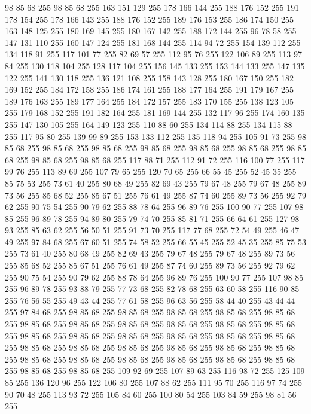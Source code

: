 98 85 68 255 98 85 68 255 163 151 129 255 178 166 144 255 188 176 152 255 191 178 154 255 178 166 143 255 188 176 152 255 189 176 153 255 186 174 150 255 163 148 125 255 180 169 145 255 180 167 142 255 188 172 144 255 96 78 58 255 147 131 110 255 160 147 124 255 181 168 144 255 114 94 72 255 154 139 112 255 134 118 91 255 117 101 77 255 82 69 57 255 112 95 76 255 122 106 89 255 113 97 84 255 130 118 104 255 128 117 104 255 156 145 133 255 153 144 133 255 147 135 122 255 141 130 118 255 136 121 108 255 158 143 128 255 180 167 150 255 182 169 152 255 184 172 158 255 186 174 161 255 188 177 164 255 191 179 167 255 189 176 163 255 189 177 164 255 184 172 157 255 183 170 155 255 138 123 105 255 179 168 152 255 191 182 164 255 181 169 144 255 132 117 96 255 174 160 135 255 147 130 105 255 164 149 123 255 110 88 60 255 134 114 88 255 134 115 88 255 117 95 80 255 139 99 89 255 153 133 112 255 135 118 94 255 105 91 73 255 98 85 68 255 98 85 68 255 98 85 68 255 98 85 68 255
98 85 68 255 98 85 68 255 98 85 68 255 98 85 68 255 98 85 68 255 117 88 71 255 112 91 72 255 116 100 77 255 117 99 76 255 113 89 69 255 107 79 65 255 120 70 65 255 66 55 45 255 52 45 35 255 85 75 53 255 73 61 40 255 80 68 49 255 82 69 43 255 79 67 48 255 79 67 48 255 89 73 56 255 85 68 52 255 85 67 51 255 76 61 49 255 87 74 60 255 89 73 56 255 92 79 62 255 90 75 54 255 90 79 62 255 88 78 64 255 96 89 76 255 100 90 77 255 107 98 85 255 96 89 78 255 94 89 80 255 79 74 70 255 85 81 71 255 66 64 61 255 127 98 93 255 85 63 62 255 56 50 51 255 91 73 70 255 117 77 68 255 72 54 49 255 46 47 49 255 97 84 68 255 67 60 51 255 74 58 52 255 66 55 45 255 52 45 35 255 85 75 53 255 73 61 40 255 80 68 49 255 82 69 43 255 79 67 48 255 79 67 48 255 89 73 56 255 85 68 52 255 85 67 51 255 76 61 49 255 87 74 60 255 89 73 56 255 92 79 62 255 90 75 54 255
90 79 62 255 88 78 64 255 96 89 76 255 100 90 77 255 107 98 85 255 96 89 78 255 93 88 79 255 77 73 68 255 82 78 68 255 63 60 58 255 116 90 85 255 76 56 55 255 49 43 44 255 77 61 58 255 96 63 56 255 58 44 40 255 43 44 44 255 97 84 68 255 98 85 68 255 98 85 68 255 98 85 68 255 98 85 68 255 98 85 68 255 98 85 68 255 98 85 68 255 98 85 68 255 98 85 68 255 98 85 68 255 98 85 68 255 98 85 68 255 98 85 68 255 98 85 68 255 98 85 68 255 98 85 68 255 98 85 68 255 98 85 68 255 98 85 68 255 98 85 68 255 98 85 68 255 98 85 68 255 98 85 68 255 98 85 68 255 98 85 68 255 98 85 68 255 98 85 68 255 98 85 68 255 98 85 68 255 98 85 68 255 98 85 68 255 109 92 69 255 107 89 63 255 116 98 72 255 125 109 85 255 136 120 96 255 122 106 80 255 107 88 62 255 111 95 70 255 116 97 74 255 90 70 48 255 113 93 72 255 105 84 60 255 100 80 54 255 103 84 59 255 98 81 56 255
